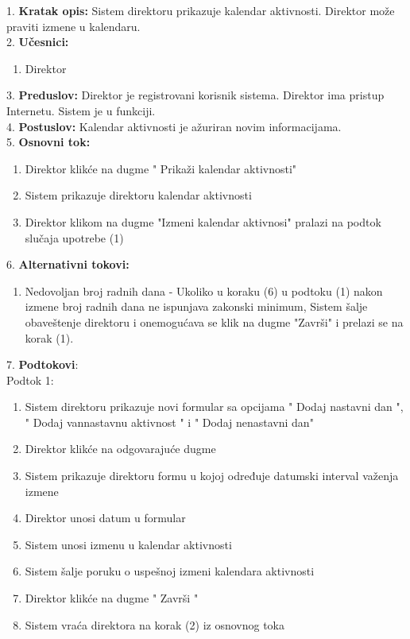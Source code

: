 \documentclass{article}
\begin{document}
1. \textbf{Kratak opis:} Sistem direktoru prikazuje kalendar aktivnosti. Direktor može praviti izmene u kalendaru.\\

2. \textbf{Učesnici:}
\begin{enumerate} 
\item Direktor
\end{enumerate} 

3. \textbf{Preduslov:} Direktor je registrovani korisnik sistema. Direktor ima pristup Internetu. Sistem je u funkciji.\\

4. \textbf{Postuslov:}  Kalendar aktivnosti je ažuriran novim informacijama.\\

5. \textbf{Osnovni tok:} 
\begin{enumerate} 
\item Direktor klikće na dugme " Prikaži kalendar aktivnosti" 
\item Sistem prikazuje direktoru kalendar aktivnosti
\item Direktor klikom na dugme "Izmeni kalendar aktivnosi" pralazi na podtok slučaja upotrebe (1) 
\end{enumerate}

6. \textbf{Alternativni tokovi:}
\begin{enumerate} 
\item Nedovoljan broj radnih dana - Ukoliko u koraku (6) u podtoku (1) nakon izmene broj radnih dana ne ispunjava zakonski minimum,  Sistem šalje obaveštenje direktoru i onemogućava se klik na dugme "Završi" i prelazi se na korak (1).
\end{enumerate}

7. \textbf{Podtokovi}:  \\
Podtok 1:
\begin{enumerate}
\item Sistem direktoru prikazuje novi formular sa opcijama " {Dodaj nastavni dan} ", " {Dodaj vannastavnu aktivnost} " i "{ Dodaj} nenastavni dan"
\item Direktor klikće na odgovarajuće dugme
\item Sistem prikazuje direktoru formu u kojoj određuje datumski interval važenja izmene
\item Direktor unosi datum u formular
\item Sistem unosi izmenu u kalendar aktivnosti
\item Sistem šalje poruku o uspešnoj izmeni kalendara aktivnosti
\item Direktor klikće na dugme " {Završi} " 
\item Sistem vraća direktora na korak (2) iz osnovnog toka 
\end{enumerate} 
\end{document}
